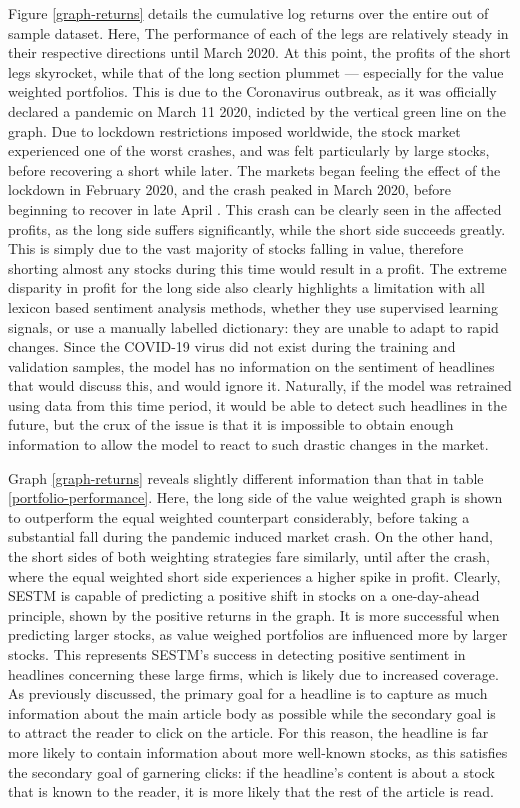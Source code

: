 Figure \ref{graph-returns} details the cumulative log returns over the entire out of sample dataset. Here, The performance of each of the legs are relatively steady in their respective directions until March 2020. At this point, the profits of the short legs skyrocket, while that of the long section plummet --- especially for the value weighted portfolios. This is due to the Coronavirus outbreak, as it was officially declared a pandemic on March 11 2020, indicted by the vertical green line on the graph. Due to lockdown restrictions imposed worldwide, the stock market experienced one of the worst crashes, and was felt particularly by large stocks, before recovering a short while later. The markets began feeling the effect of the lockdown in February 2020, and the crash peaked in March 2020, before beginning to recover in late April \parencite{covid-impact}. This crash can be clearly seen in the affected profits, as the long side suffers significantly, while the short side succeeds greatly. This is simply due to the vast majority of stocks falling in value, therefore shorting almost any stocks during this time would result in a profit. The extreme disparity in profit for the long side also clearly highlights a limitation with all lexicon based sentiment analysis methods, whether they use supervised learning signals, or use a manually labelled dictionary: they are unable to adapt to rapid changes. Since the COVID-19 virus did not exist during the training and validation samples, the model has no information on the sentiment of headlines that would discuss this, and would ignore it. Naturally, if the model was retrained using data from this time period, it would be able to detect such headlines in the future, but the crux of the issue is that it is impossible to obtain enough information to allow the model to react to such drastic changes in the market.

Graph \ref{graph-returns} reveals slightly different information than that in table \ref{portfolio-performance}. Here, the long side of the value weighted graph is shown to outperform the equal weighted counterpart considerably, before taking a substantial fall during the pandemic induced market crash. On the other hand, the short sides of both weighting strategies fare similarly, until after the crash, where the equal weighted short side experiences a higher spike in profit. Clearly, SESTM is capable of predicting a positive shift in stocks on a one-day-ahead principle, shown by the positive returns in the graph. It is more successful when predicting larger stocks, as value weighed portfolios are influenced more by larger stocks. This represents SESTM's success in detecting positive sentiment in headlines concerning these large firms, which is likely due to increased coverage. As previously discussed, the primary goal for a headline is to capture as much information about the main article body as possible while the secondary goal is to attract the reader to click on the article. For this reason, the headline is far more likely to contain information about more well-known stocks, as this satisfies the secondary goal of garnering clicks: if the headline's content is about a stock that is known to the reader, it is more likely that the rest of the article is read.


